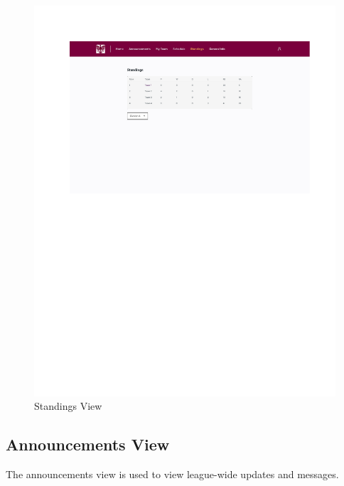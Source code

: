 \documentclass[12pt, titlepage]{article}
\begin{document}
\begin{figure}[H]
  \centering
  \includegraphics[scale=0.7]{StandingsView.pdf}
  \caption{Standings View}
  \label{fig:standings_view}
\end{figure}

\newpage

\subsection{Announcements View}
The announcements view is used to view league-wide updates and messages.
\end{document}
